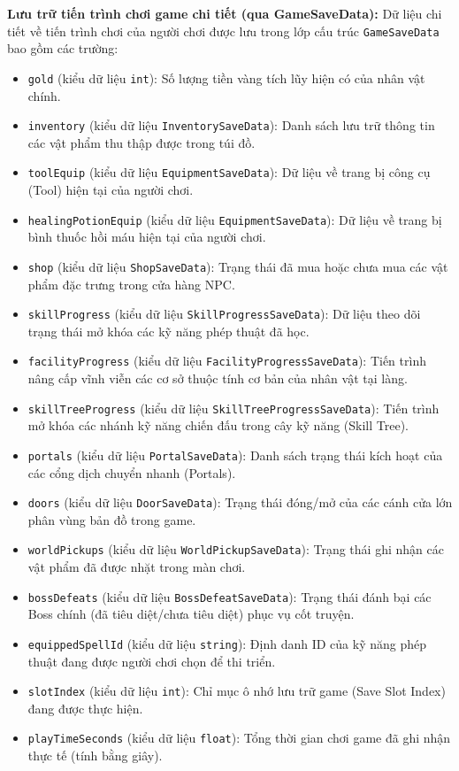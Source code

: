 \documentclass[../DoAn.tex]{subfiles}
\begin{document}
\textbf{Lưu trữ tiến trình chơi game chi tiết (qua GameSaveData):}
Dữ liệu chi tiết về tiến trình chơi của người chơi được lưu trong lớp cấu trúc \texttt{GameSaveData} bao gồm các trường:
\begin{itemize}
    \item \texttt{gold} (kiểu dữ liệu \texttt{int}): Số lượng tiền vàng tích lũy hiện có của nhân vật chính.
    \item \texttt{inventory} (kiểu dữ liệu \texttt{InventorySaveData}): Danh sách lưu trữ thông tin các vật phẩm thu thập được trong túi đồ.
    \item \texttt{toolEquip} (kiểu dữ liệu \texttt{EquipmentSaveData}): Dữ liệu về trang bị công cụ (Tool) hiện tại của người chơi.
    \item \texttt{healingPotionEquip} (kiểu dữ liệu \texttt{EquipmentSaveData}): Dữ liệu về trang bị bình thuốc hồi máu hiện tại của người chơi.
    \item \texttt{shop} (kiểu dữ liệu \texttt{ShopSaveData}): Trạng thái đã mua hoặc chưa mua các vật phẩm đặc trưng trong cửa hàng NPC.
    \item \texttt{skillProgress} (kiểu dữ liệu \texttt{SkillProgressSaveData}): Dữ liệu theo dõi trạng thái mở khóa các kỹ năng phép thuật đã học.
    \item \texttt{facilityProgress} (kiểu dữ liệu \texttt{FacilityProgressSaveData}): Tiến trình nâng cấp vĩnh viễn các cơ sở thuộc tính cơ bản của nhân vật tại làng.
    \item \texttt{skillTreeProgress} (kiểu dữ liệu \texttt{SkillTreeProgressSaveData}): Tiến trình mở khóa các nhánh kỹ năng chiến đấu trong cây kỹ năng (Skill Tree).
    \item \texttt{portals} (kiểu dữ liệu \texttt{PortalSaveData}): Danh sách trạng thái kích hoạt của các cổng dịch chuyển nhanh (Portals).
    \item \texttt{doors} (kiểu dữ liệu \texttt{DoorSaveData}): Trạng thái đóng/mở của các cánh cửa lớn phân vùng bản đồ trong game.
    \item \texttt{worldPickups} (kiểu dữ liệu \texttt{WorldPickupSaveData}): Trạng thái ghi nhận các vật phẩm đã được nhặt trong màn chơi.
    \item \texttt{bossDefeats} (kiểu dữ liệu \texttt{BossDefeatSaveData}): Trạng thái đánh bại các Boss chính (đã tiêu diệt/chưa tiêu diệt) phục vụ cốt truyện.
    \item \texttt{equippedSpellId} (kiểu dữ liệu \texttt{string}): Định danh ID của kỹ năng phép thuật đang được người chơi chọn để thi triển.
    \item \texttt{slotIndex} (kiểu dữ liệu \texttt{int}): Chỉ mục ô nhớ lưu trữ game (Save Slot Index) đang được thực hiện.
    \item \texttt{playTimeSeconds} (kiểu dữ liệu \texttt{float}): Tổng thời gian chơi game đã ghi nhận thực tế (tính bằng giây).
\end{itemize}
\end{document}
